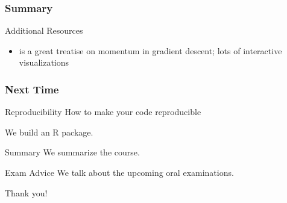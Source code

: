 \documentclass[aspectratio=1610,onlytextwidth]{beamer}
\begin{document}
\begin{frame}[c]
  \frametitle{Summary}

  \begin{block}{Additional Resources}
    \begin{itemize}
      \item \textcite{gohWhyMomentumReally2017} is a great treatise on momentum
            in gradient descent; lots of interactive visualizations
    \end{itemize}
  \end{block}
\end{frame}


\begin{frame}[c]
  \frametitle{Next Time}

  \begin{block}{Reproducibility}
    How to make your code reproducible

    \medskip

    We build an R package.
  \end{block}

  \pause

  \begin{block}{Summary}
    We summarize the course.
  \end{block}

  \pause

  \begin{block}{Exam Advice}
    We talk about the upcoming oral examinations.
  \end{block}

\end{frame}

\begin{frame}[standout]
  Thank you!
\end{frame}

% 
\end{document}
